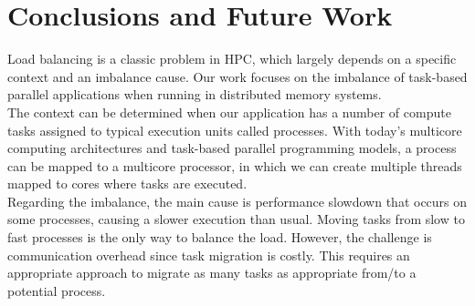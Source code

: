 \chapter{Conclusions and Future Work}
\label{ch:ConclusionFutureWork}


Load balancing is a classic problem in HPC, which largely depends on a specific context and an imbalance cause. Our work focuses on the imbalance of task-based parallel applications when running in distributed memory systems. \\

The context can be determined when our application has a number of compute tasks assigned to typical execution units called processes. With today's multicore computing architectures and task-based parallel programming models, a process can be mapped to a multicore processor, in which we can create multiple threads mapped to cores where tasks are executed.\\

Regarding the imbalance, the main cause is performance slowdown that occurs on some processes, causing a slower execution than usual. Moving tasks from slow to fast processes is the only way to balance the load. However, the challenge is communication overhead since task migration is costly. This requires an appropriate approach to migrate as many tasks as appropriate from/to a potential process.\\


